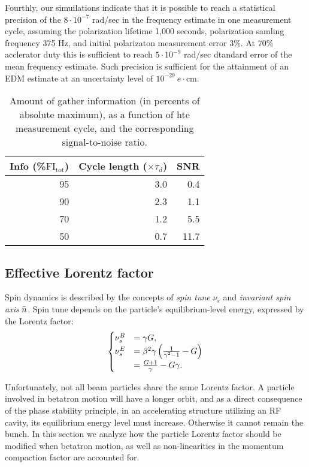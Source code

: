 Fourthly, our simuilations indicate that it is possible to reach a statistical precision of the 
$8\cdot 10^{-7}$ rad/sec in the frequency estimate in one measurement cycle, assuming the polarization
lifetime 1,000 seconds, polarization samling frequency 375 Hz, and initial polarizaton measurement error 3\%.
At 70\% acclerator duty this is sufficient to reach $5\cdot 10^{-9}$ rad/sec dtandard error of the mean
frequency estimate. Such precision is sufficient for the attainment of an EDM estimate
at an uncertainty level of $10^{-29}~e\cdot$cm.

\begin{table}[h]
	\caption{Amount of gather information (in percents of absolute maximum), as a function of hte measurement cycle, and the corresponding signal-to-noise ratio.\label{tbl:FItot}}
	
	\centering
	\begin{tabular}{rrr}
		\toprule
		Info (\%$\mathrm{FI_{tot}}$) & Cycle length ($\times\tau_d$) & SNR  \\
		\midrule
		95            & 3.0                     & 0.4         \\
		90            & 2.3                     & 1.1         \\
		70            & 1.2                     & 5.5         \\
		50            & 0.7                     & 11.7        \\
		\bottomrule
	\end{tabular}
\end{table}


\subsection{Effective Lorentz factor}\label{chpt1:FS-methods:effective-Lorentz-factor}
Spin dynamics is described by the concepts of \emph{spin tune} $\nu_s$ and \emph{invariant spin axis} $\bar n$.
Spin tune depends on the particle's  equilibrium-level energy, expressed by the Lorentz factor:
\begin{equation}\label{eq:spin_tune_vs_gamma}
  \begin{cases}
    \nu_s^B &= \gamma G, \\
    \nu_s^E &= \beta^2\gamma\bkt{\frac{1}{\gamma^2-1} - G} \\
            &= \frac{G+1}{\gamma} - G\gamma.
  \end{cases}
\end{equation}

Unfortunately, not all beam particles share the same Lorentz factor. A particle involved in betatron
motion will have a longer orbit, and as a direct consequence of the phase stability principle,
in an accelerating structure utilizing an RF cavity, its equilibrium energy level 
must increase. Otherwise it cannot remain the bunch. In this section we analyze how the particle Lorentz factor
should be modified when betatron motion, as well as non-linearities in the momentum compaction factor are
accounted for.

